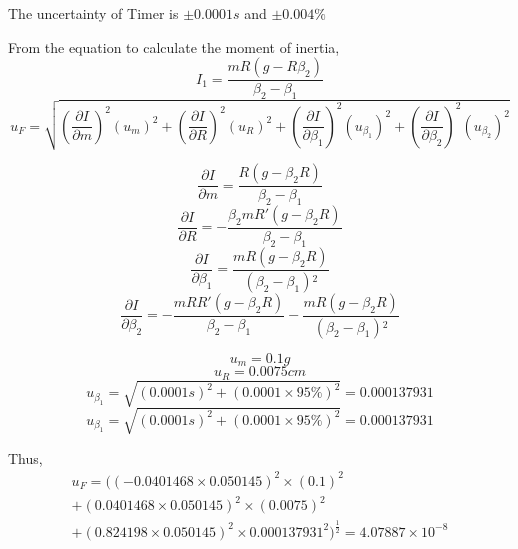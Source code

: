 The uncertainty of Timer is $\pm 0.0001s $ and $\pm 0.004\%$

From the equation to calculate the moment of inertia,
$$ I_1=\frac{mR(g-R\beta_2)}{\beta_2-\beta_1} $$
$$ u_F = \sqrt{(\frac{\partial I}{\partial m})^2(u_m)^2 +   (\frac{\partial I}{\partial R})^2(u_R)^2+(\frac{\partial I}{\partial \beta_1 })^2(u_{\beta_1})^2+ (\frac{\partial I}{\partial \beta_2})^2(u_{\beta_2})^2   }$$

$$\frac{\partial I}{\partial m} = \frac{R\left(g-\beta _2 R\right)}{\beta _2-\beta _1} $$
$$\frac{\partial I}{\partial R} = -\frac{\beta _2 m R'\left(g-\beta _2 R\right)}{\beta _2-\beta _1} $$
$$\frac{\partial I}{\partial \beta_1} = \frac{m R\left(g-\beta _2 R\right)}{\left(\beta _2-\beta _1\right){}^2} $$
$$\frac{\partial I}{\partial \beta_2} = -\frac{m R R'\left(g-\beta _2 R\right)}{\beta _2-\beta _1}-\frac{m R\left(g-\beta _2 R\right)}{\left(\beta _2-\beta _1\right){}^2} $$


$$ u_m = 0.1 g $$
$$ u_R = 0.0075 cm $$
$$ u_{\beta_1} = \sqrt{(0.0001 s)^2+(0.0001 \times 95 \% )^2} =0.000137931 $$
$$ u_{\beta_1} = \sqrt{(0.0001 s)^2+(0.0001 \times 95 \% )^2} =0.000137931 $$

Thus, 
\begin{multline*}
 u_F = ((-0.0401468 \times 0.050145)^2 \times (0.1)^2 \\   +  (0.0401468  \times 0.050145  )^2 \times (0.0075)^2  \\ + (0.824198 \times 0.050145)^2 \times   0.000137931^2  )^{\frac{1}{2}}  =  4.07887 \times 10^{-8}  
\end{multline*}



